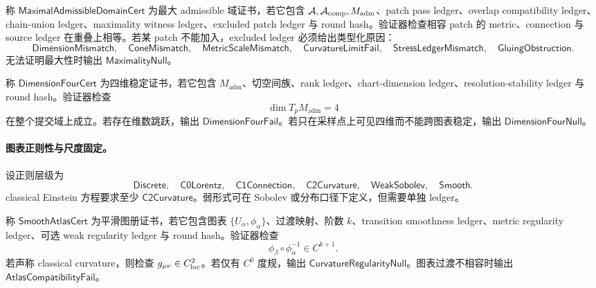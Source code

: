 \begin{definition}\label{def:typed-address-biaxial-completion-maximal-admissible-domain-cert}
称 \(\mathsf{MaximalAdmissibleDomainCert}\) 为最大 admissible 域证书，若它包含 \(\mathcal A,\mathcal A_{\rm comp},M_{\mathrm{adm}}\)、patch pass ledger、overlap compatibility ledger、chain-union ledger、maximality witness ledger、excluded patch ledger 与 round hash。验证器检查相容 patch 的 metric、connection 与 source ledger 在重叠上相等。若某 patch 不能加入，excluded ledger 必须给出类型化原因：
\[
\mathsf{DimensionMismatch},\quad
\mathsf{ConeMismatch},\quad
\mathsf{MetricScaleMismatch},\quad
\mathsf{CurvatureLimitFail},\quad
\mathsf{StressLedgerMismatch},\quad
\mathsf{GluingObstruction}.
\]
无法证明最大性时输出 \(\mathsf{MaximalityNull}\)。
\end{definition}

\begin{definition}[四维稳定证书]\label{def:typed-address-biaxial-completion-dimension-four-cert}
称 \(\mathsf{DimensionFourCert}\) 为四维稳定证书，若它包含 \(M_{\mathrm{adm}}\)、切空间族、rank ledger、chart-dimension ledger、resolution-stability ledger 与 round hash。验证器检查
\[
\dim T_pM_{\mathrm{adm}}=4
\]
在整个提交域上成立。若存在维数跳跃，输出 \(\mathsf{DimensionFourFail}\)。若只在采样点上可见四维而不能跨图表稳定，输出 \(\mathsf{DimensionFourNull}\)。
\end{definition}

\paragraph{图表正则性与尺度固定。}
设正则层级为
\[
\mathsf{Discrete},\quad
\mathsf{C0Lorentz},\quad
\mathsf{C1Connection},\quad
\mathsf{C2Curvature},\quad
\mathsf{WeakSobolev},\quad
\mathsf{Smooth}.
\]
classical Einstein 方程要求至少 \(\mathsf{C2Curvature}\)。弱形式可在 Sobolev 或分布口径下定义，但需要单独 ledger。

\begin{definition}[平滑图册证书]\label{def:typed-address-biaxial-completion-smooth-atlas-cert}
称 \(\mathsf{SmoothAtlasCert}\) 为平滑图册证书，若它包含图表 \(\{U_\alpha,\phi_\alpha\}\)、过渡映射、阶数 \(k\)、transition smoothness ledger、metric regularity ledger、可选 weak regularity ledger 与 round hash。验证器检查
\[
\phi_\beta\circ\phi_\alpha^{-1}\in C^{k+1}.
\]
若声称 classical curvature，则检查 \(g_{\mu\nu}\in C^2_{\rm loc}\)。若仅有 \(C^0\) 度规，输出 \(\mathsf{CurvatureRegularityNull}\)。图表过渡不相容时输出 \(\mathsf{AtlasCompatibilityFail}\)。
\end{definition}

